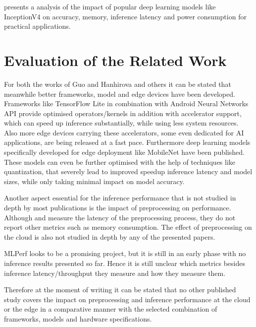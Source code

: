 \cite{DBLP:journals/corr/CanzianiPC16} presents a analysis of the impact of popular deep learning models like InceptionV4 on accuracy, memory, inference latency and power consumption for practical applications.
\section{Evaluation of the Related Work}
For both the works of Guo\cite{DBLP:conf/ic2e/Guo18} and Hanhirova and others\cite{DBLP:conf/mmsys/HanhirovaKSSHY18} it can be stated that meanwhile better frameworks, model and edge devices have been developed.
Frameworks like TensorFlow Lite in combination with Android Neural Networks API provide optimised operators/kernels in addition with accelerator support, which can speed up inference substantially, while using less system resources.
Also more edge devices carrying these accelerators, some even dedicated for AI applications, are being released at a fast pace.
Furthermore deep learning models specifically developed for edge deployment like MobileNet have been published. These models can even be further optimised with the help of techniques like quantization, that severely lead to improved speedup inference latency and model sizes, while only taking minimal impact on model accuracy.

Another aspect essential for the inference performance that is not studied in depth by most publications is the impact of preprocessing on performance.
Although \cite{DBLP:conf/ic2e/Guo18} and \cite{DBLP:conf/mmsys/HanhirovaKSSHY18} measure the latency of the preprocessing process, they do not report other metrics such as memory consumption. The effect of preprocessing on the cloud is also not studied in depth by any of the presented papers.


MLPerf looks to be a promising project, but it is still in an early phase with no inference results presented so far. Hence it is still unclear which metrics besides inference latency/throughput they measure and how they measure them.

Therefore at the moment of writing it can be stated that no other published study covers the impact on preprocessing and inference performance at the cloud or the edge in a comparative manner with the selected combination of frameworks, models and hardware specifications. 



 \endinput 

